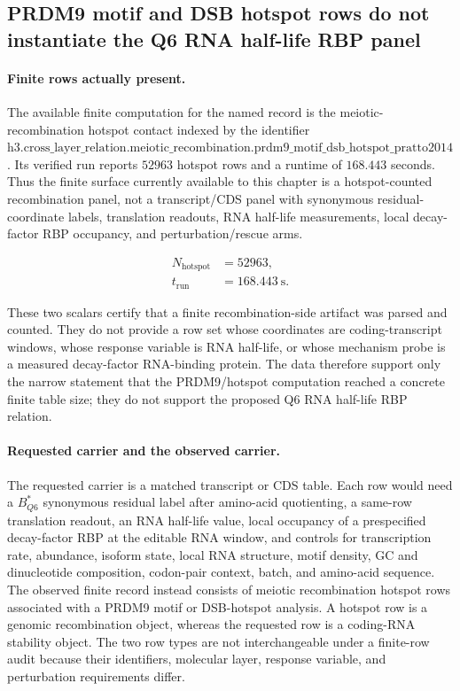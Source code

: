 
\subsection{PRDM9 motif and DSB hotspot rows do not instantiate the Q6 RNA half-life RBP panel}
\label{sec:bioreality-prdm9-hotspot-q6-rna-half-life-boundary}

\paragraph{Finite rows actually present.}
The available finite computation for the named record is the meiotic-recombination hotspot contact indexed by the identifier $\mathrm{h3.cross\_layer\_relation.meiotic\_recombination.prdm9\_motif\_dsb\_hotspot\_pratto2014}$. Its verified run reports $52963$ hotspot rows and a runtime of $168.443$ seconds. Thus the finite surface currently available to this chapter is a hotspot-counted recombination panel, not a transcript/CDS panel with synonymous residual-coordinate labels, translation readouts, RNA half-life measurements, local decay-factor RBP occupancy, and perturbation/rescue arms.

$$
\begin{aligned}
N_{\mathrm{hotspot}} &= 52963,\\
t_{\mathrm{run}} &= 168.443\ \mathrm{s}.
\end{aligned}
$$

These two scalars certify that a finite recombination-side artifact was parsed and counted. They do not provide a row set whose coordinates are coding-transcript windows, whose response variable is RNA half-life, or whose mechanism probe is a measured decay-factor RNA-binding protein. The data therefore support only the narrow statement that the PRDM9/hotspot computation reached a concrete finite table size; they do not support the proposed Q6 RNA half-life RBP relation.

\paragraph{Requested carrier and the observed carrier.}
The requested carrier is a matched transcript or CDS table. Each row would need a $B^{*}_{Q6}$ synonymous residual label after amino-acid quotienting, a same-row translation readout, an RNA half-life value, local occupancy of a prespecified decay-factor RBP at the editable RNA window, and controls for transcription rate, abundance, isoform state, local RNA structure, motif density, GC and dinucleotide composition, codon-pair context, batch, and amino-acid sequence. The observed finite record instead consists of meiotic recombination hotspot rows associated with a PRDM9 motif or DSB-hotspot analysis. A hotspot row is a genomic recombination object, whereas the requested row is a coding-RNA stability object. The two row types are not interchangeable under a finite-row audit because their identifiers, molecular layer, response variable, and perturbation requirements differ.

